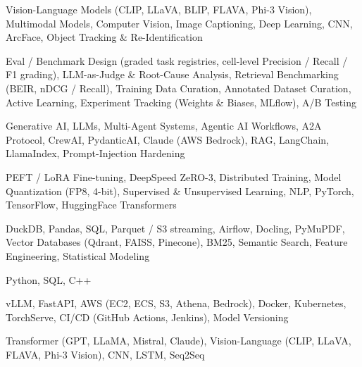 \documentclass[letter,10pt]{article}
\begin{document}
 Vision-Language Models (CLIP, LLaVA, BLIP, FLAVA, Phi-3 Vision), Multimodal Models, Computer Vision, Image Captioning, Deep Learning, CNN, ArcFace, Object Tracking \& Re-Identification\par\vspace{2pt}

 Eval / Benchmark Design (graded task registries, cell-level Precision / Recall / F1 grading), LLM-as-Judge \& Root-Cause Analysis, Retrieval Benchmarking (BEIR, nDCG / Recall), Training Data Curation, Annotated Dataset Curation, Active Learning, Experiment Tracking (Weights \& Biases, MLflow), A/B Testing\par\vspace{2pt}

 Generative AI, LLMs, Multi-Agent Systems, Agentic AI Workflows, A2A Protocol, CrewAI, PydanticAI, Claude (AWS Bedrock), RAG, LangChain, LlamaIndex, Prompt-Injection Hardening\par\vspace{2pt}

 PEFT / LoRA Fine-tuning, DeepSpeed ZeRO-3, Distributed Training, Model Quantization (FP8, 4-bit), Supervised \& Unsupervised Learning, NLP, PyTorch, TensorFlow, HuggingFace Transformers\par\vspace{2pt}

 DuckDB, Pandas, SQL, Parquet / S3 streaming, Airflow, Docling, PyMuPDF, Vector Databases (Qdrant, FAISS, Pinecone), BM25, Semantic Search, Feature Engineering, Statistical Modeling\par\vspace{2pt}

 Python, SQL, C++\par\vspace{2pt}

 vLLM, FastAPI, AWS (EC2, ECS, S3, Athena, Bedrock), Docker, Kubernetes, TorchServe, CI/CD (GitHub Actions, Jenkins), Model Versioning\par\vspace{2pt}

 Transformer (GPT, LLaMA, Mistral, Claude), Vision-Language (CLIP, LLaVA, FLAVA, Phi-3 Vision), CNN, LSTM, Seq2Seq
\end{document}
